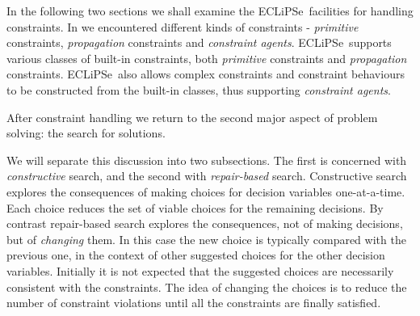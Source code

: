 \documentclass[a4wide]{article}
\newcommand{\ECL}{\mbox{ECLiPSe\ }{\hspace{1mm}}}
\begin{document}
In the following two  sections we shall examine the \ECL facilities for
handling constraints.  
In \cite{consprog} we
encountered different kinds of constraints - {\em primitive}
constraints, {\em propagation} constraints and {\em constraint
agents}.
\ECL supports various classes of built-in constraints, both {\em
primitive} constraints and 
{\em propagation} constraints.
\ECL also allows complex constraints and constraint behaviours to be
constructed from the built-in classes, thus supporting {\em constraint
agents}.





After constraint handling we return to the second major aspect of
problem solving: the search for solutions.

We will separate this discussion into two subsections.  The first is
concerned with {\em constructive} search, and the second with {\em
repair-based} search.  
Constructive search explores the consequences of making choices for
decision variables one-at-a-time.  Each choice reduces the set of
viable choices for the remaining decisions.
By contrast repair-based search explores the consequences, not of
making decisions, but of {\em changing} them.
In this case the new choice is typically compared with the previous
one, in the context of other suggested choices for the other decision
variables. 
Initially it is not expected that the suggested choices are
necessarily consistent with the constraints.  The idea of changing the
choices is to reduce the number of constraint violations until all
the constraints are finally satisfied.
\end{document}
